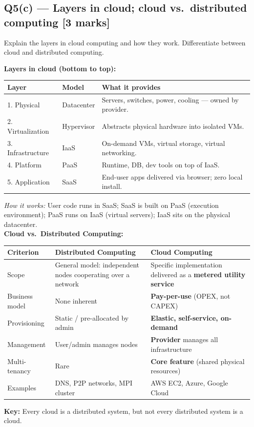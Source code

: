 \documentclass[12pt, a4paper]{article}
\newenvironment{qbox}{\begin{mdframed}[style=qframe]}{\end{mdframed}}
\newenvironment{solbox}{\begin{mdframed}[style=solframe]}{\end{mdframed}}
\newcommand{\qmarks}[1]{\hfill\textbf{\color{orange!70!black}[#1 marks]}}
\begin{document}
\subsection{Q5(c) --- Layers in cloud; cloud vs.\ distributed computing
  \texorpdfstring{\qmarks{3}}{}}
\begin{qbox}Explain the layers in cloud computing and how they work. Differentiate between
cloud and distributed computing.\end{qbox}
\begin{solbox}
\textbf{Layers in cloud (bottom to top):}
\begin{center}\renewcommand{\arraystretch}{1.3}
\begin{tabularx}{\linewidth}{l l X}
\toprule
\textbf{Layer} & \textbf{Model} & \textbf{What it provides} \\
\midrule
1. Physical       & Datacenter    & Servers, switches, power, cooling --- owned by provider. \\
2. Virtualization & Hypervisor    & Abstracts physical hardware into isolated VMs. \\
3. Infrastructure & IaaS          & On-demand VMs, virtual storage, virtual networking. \\
4. Platform       & PaaS          & Runtime, DB, dev tools on top of IaaS. \\
5. Application    & SaaS          & End-user apps delivered via browser; zero local install. \\
\bottomrule
\end{tabularx}\end{center}
\textit{How it works:} User code runs in SaaS; SaaS is built on PaaS (execution environment);
PaaS runs on IaaS (virtual servers); IaaS sits on the physical datacenter.\\[6pt]

\textbf{Cloud vs.\ Distributed Computing:}
\begin{center}\renewcommand{\arraystretch}{1.25}
\begin{tabularx}{\linewidth}{l X X}
\toprule
\textbf{Criterion} & \textbf{Distributed Computing} & \textbf{Cloud Computing} \\
\midrule
Scope        & General model: independent nodes cooperating over a network & Specific implementation delivered as a \textbf{metered utility service} \\
Business model & None inherent & \textbf{Pay-per-use} (OPEX, not CAPEX) \\
Provisioning & Static / pre-allocated by admin & \textbf{Elastic, self-service, on-demand} \\
Management   & User/admin manages nodes & \textbf{Provider} manages all infrastructure \\
Multi-tenancy & Rare & \textbf{Core feature} (shared physical resources) \\
Examples     & DNS, P2P networks, MPI cluster & AWS EC2, Azure, Google Cloud \\
\bottomrule
\end{tabularx}\end{center}
\textbf{Key:} Every cloud is a distributed system, but not every distributed system is a
cloud.
\end{solbox}
\end{document}
